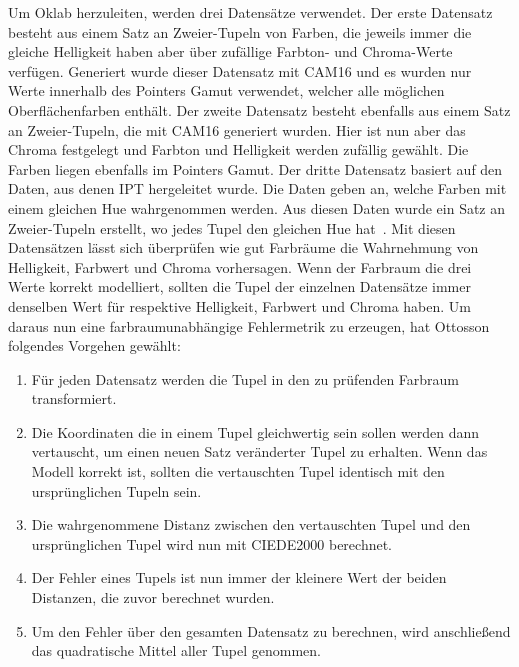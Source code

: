 \documentclass[12pt, a4paper, ngerman]{article}
\begin{document}
Um Oklab herzuleiten, werden drei Datensätze verwendet. 
Der erste Datensatz besteht aus einem Satz an Zweier-Tupeln von Farben, die jeweils immer die gleiche Helligkeit haben aber über zufällige Farbton- und Chroma-Werte verfügen.
Generiert wurde dieser Datensatz mit CAM16 und es wurden nur Werte innerhalb des Pointers Gamut verwendet, welcher alle möglichen Oberflächenfarben enthält.
Der zweite Datensatz besteht ebenfalls aus einem Satz an Zweier-Tupeln, die mit CAM16 generiert wurden. 
Hier ist nun aber das Chroma festgelegt und Farbton und Helligkeit werden zufällig gewählt. Die Farben liegen ebenfalls im Pointers Gamut.
Der dritte Datensatz basiert auf den Daten, aus denen IPT hergeleitet wurde. Die Daten geben an, welche Farben mit einem gleichen Hue wahrgenommen werden. 
Aus diesen Daten wurde ein Satz an Zweier-Tupeln erstellt, wo jedes Tupel den gleichen Hue hat~\cite{Oklab_2020}.
Mit diesen Datensätzen lässt sich überprüfen wie gut Farbräume die Wahrnehmung von Helligkeit, Farbwert und Chroma vorhersagen. 
Wenn der Farbraum die drei Werte korrekt modelliert, sollten die Tupel der einzelnen Datensätze immer denselben Wert für respektive Helligkeit, Farbwert und Chroma haben.
Um daraus nun eine farbraumunabhängige Fehlermetrik zu erzeugen, hat Ottosson folgendes Vorgehen gewählt:
\begin{enumerate}
  \item Für jeden Datensatz werden die Tupel in den zu prüfenden Farbraum transformiert.
  \item Die Koordinaten die in einem Tupel gleichwertig sein sollen werden dann vertauscht, um einen neuen Satz veränderter Tupel zu erhalten. Wenn das Modell korrekt ist, sollten die vertauschten Tupel identisch mit den ursprünglichen Tupeln sein. 
  \item Die wahrgenommene Distanz zwischen den vertauschten Tupel und den ursprünglichen Tupel wird nun mit CIEDE2000 berechnet. 
  \item Der Fehler eines Tupels ist nun immer der kleinere Wert der beiden Distanzen, die zuvor berechnet wurden.
  \item Um den Fehler über den gesamten Datensatz zu berechnen, wird anschließend das quadratische Mittel aller Tupel genommen.
\end{enumerate}
\end{document}
